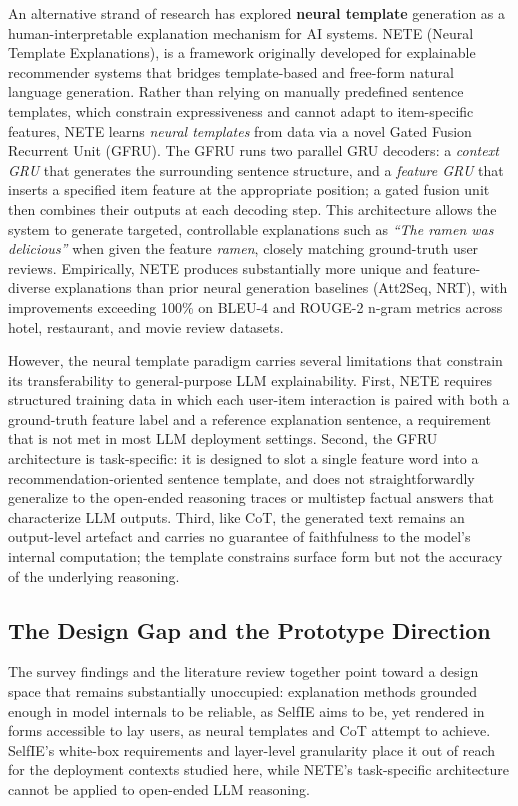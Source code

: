 An alternative strand of research has explored \textbf{neural template} generation as a human-interpretable explanation mechanism for AI systems. NETE (Neural Template Explanations), is a framework originally developed for explainable recommender systems that bridges template-based and free-form natural language generation. Rather than relying on manually predefined sentence templates, which constrain expressiveness and cannot adapt to item-specific features, NETE learns \emph{neural templates} from data via a novel Gated Fusion Recurrent Unit (GFRU). The GFRU runs two parallel GRU decoders: a \emph{context GRU} that generates the surrounding sentence structure, and a \emph{feature GRU} that inserts a specified item feature at the appropriate position; a gated fusion unit then combines their outputs at each decoding step. This architecture allows the system to generate targeted, controllable explanations such as \emph{``The ramen was delicious''} when given the feature \emph{ramen}, closely matching ground-truth user reviews. Empirically, NETE produces substantially more unique and feature-diverse explanations than prior neural generation baselines (Att2Seq, NRT), with improvements exceeding 100\% on BLEU-4 and ROUGE-2 n-gram metrics across hotel, restaurant, and movie review datasets.\cite{li_generate_2020}

However, the neural template paradigm carries several limitations that constrain its transferability to general-purpose LLM explainability. First, NETE requires structured training data in which each user-item interaction is paired with both a ground-truth feature label and a reference explanation sentence, a requirement that is not met in most LLM deployment settings. Second, the GFRU architecture is task-specific: it is designed to slot a single feature word into a recommendation-oriented sentence template, and does not straightforwardly generalize to the open-ended reasoning traces or multistep factual answers that characterize LLM outputs. Third, like CoT, the generated text remains an output-level artefact and carries no guarantee of faithfulness to the model's internal computation; the template constrains surface form but not the accuracy of the underlying reasoning.

\subsection{The Design Gap and the Prototype Direction}

The survey findings and the literature review together point toward a design space that
remains substantially unoccupied: explanation methods grounded enough in model internals
to be reliable, as SelfIE aims to be, yet rendered in forms accessible to lay users, as neural
templates and CoT attempt to achieve. SelfIE's white-box requirements and layer-level
granularity place it out of reach for the deployment contexts studied here, while NETE's
task-specific architecture cannot be applied to open-ended LLM reasoning.

